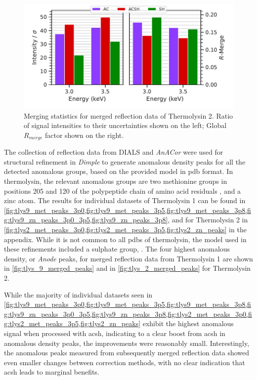 \begin{figure}
    \centering
    \includegraphics{plots/exp1/tlys_2_P6122/merged_stats.pdf}
    \caption{Merging statistics for merged reflection data of Thermolysin 2. Ratio of signal intensities to their uncertainties shown on the left; Global $R_{merge}$ factor shown on the right.}
    \label{fig:tlys_2_stats}
\end{figure}


The collection of reflection data from DIALS and \textit{AnACor} were used for structural refinement in \textit{Dimple} to generate anomalous density peaks for all the detected anomalous groups, based on the provided model in \ac{pdb} format. In thermolysin, the relevant anomalous groups are two methionine groups in positions 205 and 120 of the polypeptide chain of amino acid residuals %
, and a zinc atom. The results for individual datasets of Thermolysin 1 can be found in \cref{fig:tlys9_met_peaks_3p0,fig:tlys9_met_peaks_3p5,fig:tlys9_met_peaks_3p8,fig:tlys9_zn_peaks_3p0_3p5,fig:tlys9_zn_peaks_3p8}, and for Thermolysin 2 in \cref{fig:tlys2_met_peaks_3p0,fig:tlys2_met_peaks_3p5,fig:tlys2_zn_peaks} in the appendix. %
While it is not common to all \ac{pdb}s of thermolysin, the model used in these refinements included a sulphate group, . The four highest anomalous density, or \textit{Anode} peaks, for merged reflection data from Thermolysin 1 are shown in \cref{fig:tlys_9_merged_peaks} and in \cref{fig:tlys_2_merged_peaks} for Thermolysin 2.


While the majority of individual datasets seen in \cref{fig:tlys9_met_peaks_3p0,fig:tlys9_met_peaks_3p5,fig:tlys9_met_peaks_3p8,fig:tlys9_zn_peaks_3p0_3p5,fig:tlys9_zn_peaks_3p8,fig:tlys2_met_peaks_3p0,fig:tlys2_met_peaks_3p5,fig:tlys2_zn_peaks} exhibit the highest anomalous signal when processed with \ac{acsh}, indicating to a clear boost from \ac{acsh} in anomalous density peaks, the improvements were reasonably small. Interestingly, the anomalous peaks measured from subsequently merged reflection data showed even smaller changes between correction methods, with no clear indication that \ac{acsh} leads to marginal benefits.

